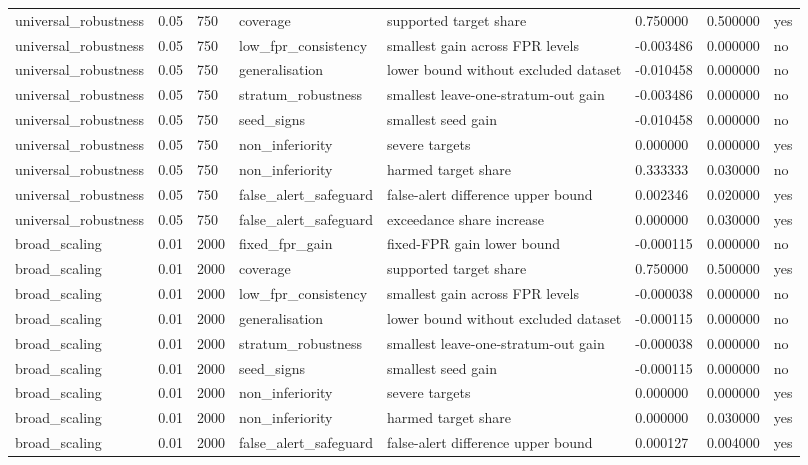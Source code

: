 \begin{tabular}{llllllll}
universal\_robustness & 0.05 & 750 & coverage & supported target share & 0.750000 & 0.500000 & yes \\
universal\_robustness & 0.05 & 750 & low\_fpr\_consistency & smallest gain across FPR levels & -0.003486 & 0.000000 & no \\
universal\_robustness & 0.05 & 750 & generalisation & lower bound without excluded dataset & -0.010458 & 0.000000 & no \\
universal\_robustness & 0.05 & 750 & stratum\_robustness & smallest leave-one-stratum-out gain & -0.003486 & 0.000000 & no \\
universal\_robustness & 0.05 & 750 & seed\_signs & smallest seed gain & -0.010458 & 0.000000 & no \\
universal\_robustness & 0.05 & 750 & non\_inferiority & severe targets & 0.000000 & 0.000000 & yes \\
universal\_robustness & 0.05 & 750 & non\_inferiority & harmed target share & 0.333333 & 0.030000 & no \\
universal\_robustness & 0.05 & 750 & false\_alert\_safeguard & false-alert difference upper bound & 0.002346 & 0.020000 & yes \\
universal\_robustness & 0.05 & 750 & false\_alert\_safeguard & exceedance share increase & 0.000000 & 0.030000 & yes \\
broad\_scaling & 0.01 & 2000 & fixed\_fpr\_gain & fixed-FPR gain lower bound & -0.000115 & 0.000000 & no \\
broad\_scaling & 0.01 & 2000 & coverage & supported target share & 0.750000 & 0.500000 & yes \\
broad\_scaling & 0.01 & 2000 & low\_fpr\_consistency & smallest gain across FPR levels & -0.000038 & 0.000000 & no \\
broad\_scaling & 0.01 & 2000 & generalisation & lower bound without excluded dataset & -0.000115 & 0.000000 & no \\
broad\_scaling & 0.01 & 2000 & stratum\_robustness & smallest leave-one-stratum-out gain & -0.000038 & 0.000000 & no \\
broad\_scaling & 0.01 & 2000 & seed\_signs & smallest seed gain & -0.000115 & 0.000000 & no \\
broad\_scaling & 0.01 & 2000 & non\_inferiority & severe targets & 0.000000 & 0.000000 & yes \\
broad\_scaling & 0.01 & 2000 & non\_inferiority & harmed target share & 0.000000 & 0.030000 & yes \\
broad\_scaling & 0.01 & 2000 & false\_alert\_safeguard & false-alert difference upper bound & 0.000127 & 0.004000 & yes \\

\end{tabular}

